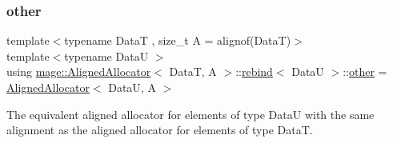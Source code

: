\subsubsection{\texorpdfstring{other}{other}}
{\footnotesize\ttfamily template$<$typename DataT , size\+\_\+t A = alignof(\+Data\+T)$>$ \\
template$<$typename DataU $>$ \\
using \mbox{\hyperlink{classmage_1_1_aligned_allocator}{mage\+::\+Aligned\+Allocator}}$<$ DataT, A $>$\+::\mbox{\hyperlink{structmage_1_1_aligned_allocator_1_1rebind}{rebind}}$<$ DataU $>$\+::\mbox{\hyperlink{structmage_1_1_aligned_allocator_1_1rebind_a61200e3d00bab815566641db0f33b3d3}{other}} =  \mbox{\hyperlink{classmage_1_1_aligned_allocator}{Aligned\+Allocator}}$<$ DataU, A $>$}

The equivalent aligned allocator for elements of type {\ttfamily DataU} with the same alignment as the aligned allocator for elements of type {\ttfamily DataT}. 